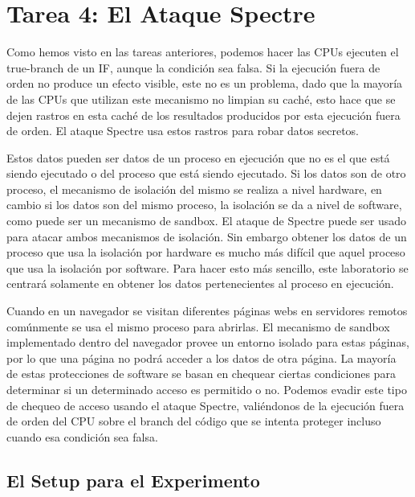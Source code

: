 \section{Tarea 4: El Ataque Spectre}

Como hemos visto en las tareas anteriores, podemos hacer las CPUs ejecuten el true-branch de un IF, aunque la condición sea falsa. Si la ejecución fuera de orden no produce un efecto visible, este no es un problema, dado que la mayoría de las CPUs que utilizan este mecanismo no limpian su caché, esto hace que se dejen rastros en esta caché de los resultados producidos por esta ejecución fuera de orden. El ataque Spectre usa estos rastros para robar datos secretos.

Estos datos pueden ser datos de un proceso en ejecución que no es el que está siendo ejecutado o del proceso que está siendo ejecutado. Si los datos son de otro proceso, el mecanismo de isolación del mismo se realiza a nivel hardware, en cambio si los datos son del mismo proceso, la isolación se da a nivel de software, como puede ser un mecanismo de sandbox.
El ataque de Spectre puede ser usado para atacar ambos mecanismos de isolación.
Sin embargo obtener los datos de un proceso que usa la isolación por hardware es mucho más difícil que aquel proceso que usa la isolación por software. 
Para hacer esto más sencillo, este laboratorio se centrará solamente en obtener los datos pertenecientes al proceso en ejecución.

Cuando en un navegador se visitan diferentes páginas webs en servidores remotos comúnmente se usa el mismo proceso para abrirlas. El mecanismo de sandbox implementado dentro del navegador provee un entorno isolado para estas páginas, por lo que una página no podrá acceder a los datos de otra página.
La mayoría de estas protecciones de software se basan en chequear ciertas condiciones para determinar si un determinado acceso es permitido o no. 
Podemos evadir este tipo de chequeo de acceso usando el ataque Spectre, valiéndonos de la ejecución fuera de orden del CPU sobre el branch del código que se intenta proteger incluso cuando esa condición sea falsa.


\subsection{El Setup para el Experimento} 


